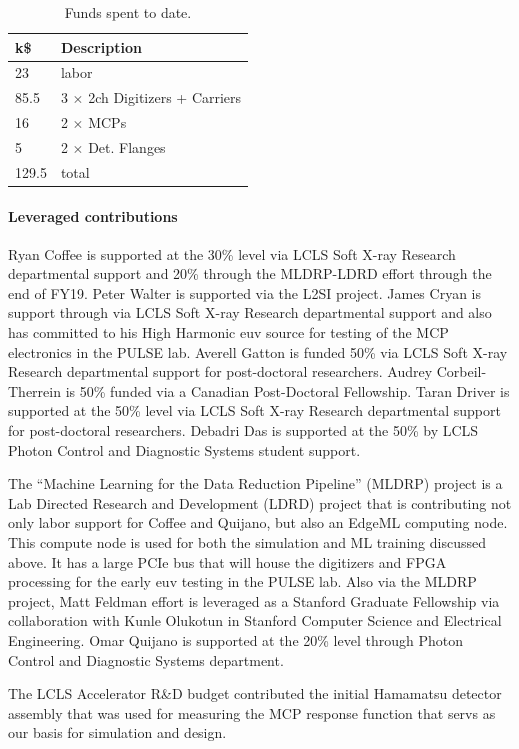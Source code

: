 \documentclass[aps]{revtex4}
\begin{document}
\begin{table}
\caption{\label{tab::fundstodate}
Funds spent to date.
}
\begin{tabular}{|ll|}
\hline
k\$ & Description \\
\hline
23	& labor\\
85.5 	& 3 $\times$ 2ch Digitizers + Carriers\\
16	& 2 $\times$ MCPs\\
5	& 2 $\times$ Det. Flanges\\
\hline
\hline
129.5	& total\\
\hline
\end{tabular}
\end{table}

\paragraph*{Leveraged contributions}
Ryan Coffee is supported at the 30\% level via LCLS Soft X-ray Research departmental support and 20\% through the MLDRP-LDRD effort through the end of FY19. 
Peter Walter is supported via the L2SI project.  
James Cryan is support through via LCLS Soft X-ray Research departmental support and also has committed to his High Harmonic euv source for testing of the MCP electronics in the PULSE lab.
Averell Gatton is funded 50\% via LCLS Soft X-ray Research departmental support for post-doctoral researchers.
Audrey Corbeil-Therrein is 50\% funded via a Canadian Post-Doctoral Fellowship.
Taran Driver is supported at the 50\% level via LCLS Soft X-ray Research departmental support for post-doctoral researchers.
Debadri Das is supported at the 50\% by LCLS Photon Control and Diagnostic Systems student support.

The ``Machine Learning for the Data Reduction Pipeline'' (MLDRP) project is a Lab Directed Research and Development (LDRD) project that is contributing not only labor support for Coffee and Quijano, but also an EdgeML computing node.
This compute node is used for both the simulation and ML training discussed above.
It has a large PCIe bus that will house the digitizers and FPGA processing for the early euv testing in the PULSE lab.
Also via the MLDRP project, Matt Feldman effort is leveraged as a Stanford Graduate Fellowship via collaboration with Kunle Olukotun in Stanford Computer Science and Electrical Engineering.
Omar Quijano is supported at the 20\% level through Photon Control and Diagnostic Systems department.

The LCLS Accelerator R\&D budget contributed the initial Hamamatsu detector assembly that was used for measuring the MCP response function that servs as our basis for simulation and design. 
\end{document}
